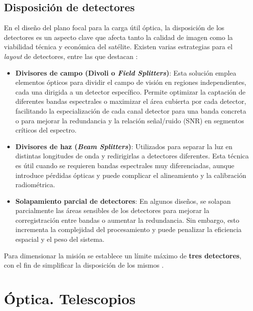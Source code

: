 \subsection{Disposición de detectores}

En el diseño del plano focal para la carga útil óptica, la disposición de los detectores es un aspecto clave que afecta tanto la calidad de imagen como la viabilidad técnica y económica del satélite. Existen varias estrategias para el \textit{layout} de detectores, entre las que destacan \cite{kaplan_optical_2011}:

\begin{itemize}
    \item \textbf{Divisores de campo (Divoli o \textit{Field Splitters})}: Esta solución emplea elementos ópticos para dividir el campo de visión en regiones independientes, cada una dirigida a un detector específico. Permite optimizar la captación de diferentes bandas espectrales o maximizar el área cubierta por cada detector, facilitando la especialización de cada canal detector para una banda concreta o para mejorar la redundancia y la relación señal/ruido (SNR) en segmentos críticos del espectro.

    \item \textbf{Divisores de haz (\textit{Beam Splitters})}: Utilizados para separar la luz en distintas longitudes de onda y redirigirlas a detectores diferentes. Esta técnica es útil cuando se requieren bandas espectrales muy diferenciadas, aunque introduce pérdidas ópticas y puede complicar el alineamiento y la calibración radiométrica.

    \item \textbf{Solapamiento parcial de detectores}: En algunos diseños, se solapan parcialmente las áreas sensibles de los detectores para mejorar la corregistración entre bandas o aumentar la redundancia. Sin embargo, esto incrementa la complejidad del procesamiento y puede penalizar la eficiencia espacial y el peso del sistema.
\end{itemize}

Para dimensionar la misión se establece un límite máximo de \textbf{tres detectores}, con el fin de simplificar la disposición de los mismos \cite{design_workshop_optical_2023}.

\section{Óptica. Telescopios}

